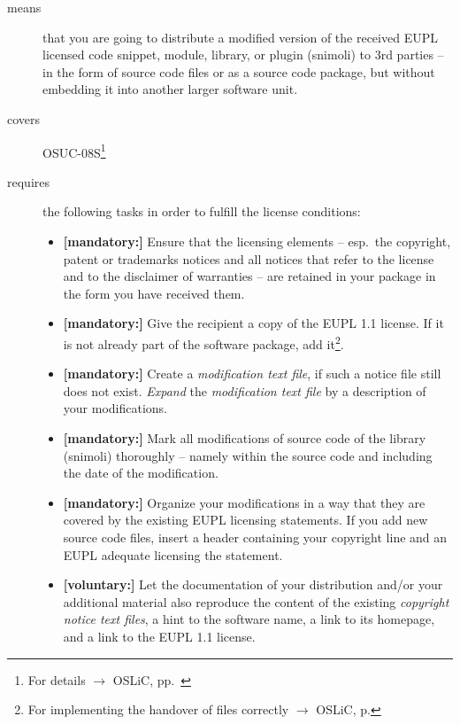\begin{description}
\item[means] that you are going to distribute a modified version of the received
EUPL licensed code snippet, module, library, or plugin (snimoli) to 3rd parties
-- in the form of source code files or as a source code package, but without
embedding it into another larger software unit.
\item[covers] OSUC-08S\footnote{For details $\rightarrow$ OSLiC, pp.\
\pageref{OSUC-08S-DEF}}
\item[requires] the following tasks in order to fulfill the license conditions:
\begin{itemize}
  
  \item \textbf{[mandatory:]} Ensure that the licensing elements -- esp.\ the
  copyright, patent or trademarks notices and all notices that refer to the
  license and to the disclaimer of warranties -- are retained in your package in
  the form you have received them.
  
  \item \textbf{[mandatory:]} Give the recipient a copy of the EUPL 1.1
  license. If it is not already part of the software package, add
  it\footnote{For implementing the handover of files correctly $\rightarrow$
  OSLiC, p. \pageref{DistributingFilesHint}}.

  \item \textbf{[mandatory:]} Create a \emph{modification text file}, if such a
  notice file still does not exist. \emph{Expand} the \emph{modification text
  file} by a description of your modifications.
  
  \item \textbf{[mandatory:]} Mark all modifications of source code of the
  library (snimoli) thoroughly -- namely within the source code and including
  the date of the modification.
   
  \item \textbf{[mandatory:]} Organize your modifications in a way that they are
  covered by the existing EUPL licensing statements. If you add new source code
  files, insert a header containing your copyright line and an EUPL adequate
  licensing the statement.
  
  \item \textbf{[voluntary:]} Let the documentation of your distribution and/or
  your additional material  also reproduce the content of the existing
  \emph{copyright notice text files}, a hint to the software name, a link to its
  homepage, and a link to the EUPL 1.1 license.


\end{itemize}
\end{description}
